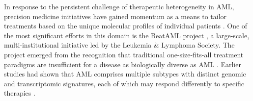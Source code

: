 \documentclass[pdflatex,sn-mathphys-num]{sn-jnl}
\theoremstyle{thmstyleone}
\theoremstyle{thmstyletwo}
\theoremstyle{thmstylethree}
\begin{document}
In response to the persistent challenge of therapeutic heterogeneity in AML, precision medicine initiatives have gained momentum as a means to tailor treatments based on the unique molecular profiles of individual patients \cite{lohse2018precision}. One of the most significant efforts in this domain is the BeatAML project \cite{tyner2018functional}, a large-scale, multi-institutional initiative led by the Leukemia \& Lymphoma Society. The project emerged from the recognition that traditional one-size-fits-all treatment paradigms are insufficient for a disease as biologically diverse as AML \cite{bottomly2022integrative}. Earlier studies had shown that AML comprises multiple subtypes with distinct genomic and transcriptomic signatures, each of which may respond differently to specific therapies \cite{mo2023integrative,bottomly2022integrative}.
\end{document}
